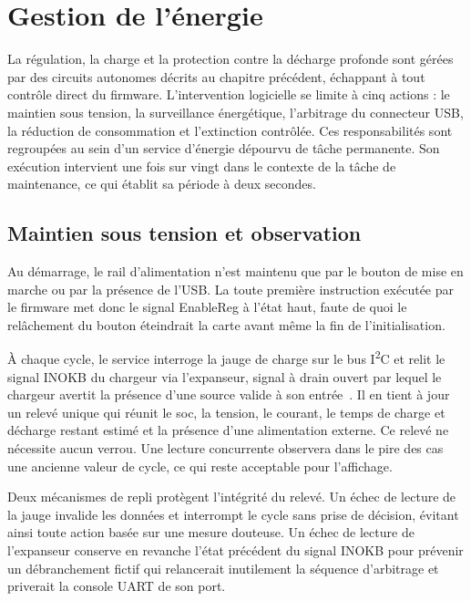 \section{Gestion de l'énergie}
\label{sec:soft_power}

La régulation, la charge et la protection contre la décharge profonde sont gérées par des circuits autonomes décrits au chapitre précédent, échappant à tout contrôle direct du firmware. L'intervention logicielle se limite à cinq actions : le maintien sous tension, la surveillance énergétique, l'arbitrage du connecteur USB, la réduction de consommation et l'extinction contrôlée. Ces responsabilités sont regroupées au sein d'un service d'énergie dépourvu de tâche permanente. Son exécution intervient une fois sur vingt dans le contexte de la tâche de maintenance, ce qui établit sa période à deux secondes.

\subsection{Maintien sous tension et observation}

Au démarrage, le rail d'alimentation n'est maintenu que par le bouton de mise en marche ou par la présence de l'USB. La toute première instruction exécutée par le firmware met donc le signal EnableReg à l'état haut, faute de quoi le relâchement du bouton éteindrait la carte avant même la fin de l'initialisation.

À chaque cycle, le service interroge la jauge de charge sur le bus I\textsuperscript{2}C et relit le signal INOKB du chargeur via l'expanseur, signal à drain ouvert par lequel le chargeur avertit la présence d'une source valide à son entrée~\cite{analog_MAX77757}. Il en tient à jour un relevé unique qui réunit le \gls{soc}, la tension, le courant, le temps de charge et décharge restant estimé et la présence d'une alimentation externe. Ce relevé ne nécessite aucun verrou. Une lecture concurrente observera dans le pire des cas une ancienne valeur de cycle, ce qui reste acceptable pour l'affichage.

Deux mécanismes de repli protègent l'intégrité du relevé. Un échec de lecture de la jauge invalide les données et interrompt le cycle sans prise de décision, évitant ainsi toute action basée sur une mesure douteuse. Un échec de lecture de l'expanseur conserve en revanche l'état précédent du signal INOKB pour prévenir un débranchement fictif qui relancerait inutilement la séquence d'arbitrage et priverait la console UART de son port.

